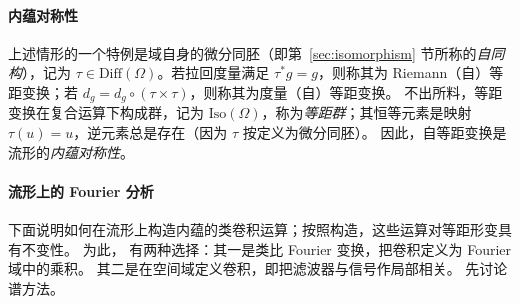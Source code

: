 

\paragraph{内蕴对称性}
上述情形的一个特例是域自身的微分同胚（即第~\ref{sec:isomorphism} 节所称的{\em 自同构}），记为 $\tau \in \mathrm{Diff}(\Omega)$。若拉回度量满足 $\tau^* g = g$，则称其为 Riemann\mbox{（自）等距变换}；若 $d_g = d_g\circ (\tau \times \tau)$，则称其为度量（自）等距变换。
%
不出所料，等距变换在复合运算下构成群，记为 $\mathrm{Iso}(\Omega)$，称为{\em 等距群}；其恒等元素是映射 $\tau(u) = u$，逆元素总是存在（因为 $\tau$ 按定义为微分同胚）。
%
因此，自等距变换是流形的{\em 内蕴对称性}。





\paragraph{流形上的 Fourier 分析}
%
下面说明如何在流形上构造内蕴的类卷积运算；按照构造，这些运算对等距形变具有不变性。
为此，
有两种选择：其一是类比 Fourier 变换，把卷积定义为 Fourier 域中的乘积。
%
其二是在空间域定义卷积，即把滤波器与信号作局部相关。
先讨论谱方法。


